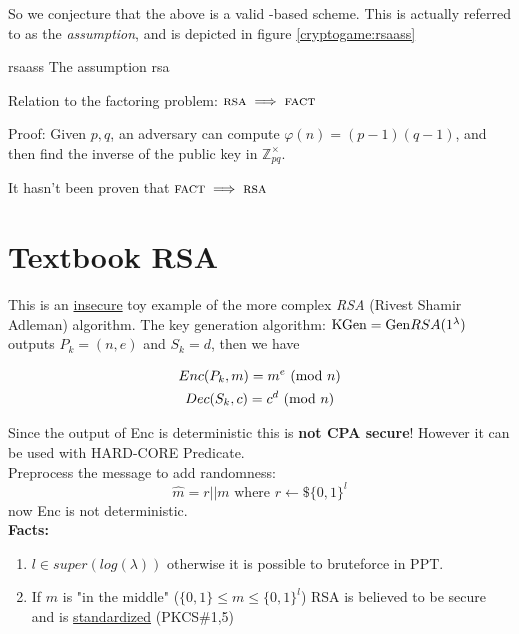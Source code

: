 So we conjecture that the above is a valid \tdp-based \pke scheme. This is actually referred to as the \emph{\rsa{} assumption}, and is depicted in figure \ref{cryptogame:rsaass}

\begin{cryptogame}
    {rsaass}
    {The \rsa{} assumption}
    {rsa}


    \cseqdelay


\end{cryptogame}


Relation to the factoring problem: $\textsc{rsa} \implies \textsc{fact}$

Proof: Given $p, q$, an adversary can compute $\varphi(n) = (p-1)(q-1)$, and then find the inverse of the public key in $\mathbb{Z}_{pq}^\times$.

It hasn't been proven that $\textsc{fact} \implies \textsc{rsa}$


\section{Textbook RSA}
This is an \underline{insecure} toy example of the more complex \textit{RSA} (Rivest Shamir Adleman) algorithm.
The key generation algorithm: $\mathrm{KGen}=\mathrm{Gen} RSA(1^{\lambda})$ outputs $P_k=(n,e)$ and $S_k=d$, then we have

\begin{gather*}
    Enc(P_k,m)=m^e\ (\mathrm{mod}\ n)\\
    Dec(S_k,c)=c^d\ (\mathrm{mod}\ n)
\end{gather*}

Since the output of Enc is deterministic this is \textbf{not CPA secure}! However it can be used with HARD-CORE Predicate.\\
Preprocess the message to add randomness:
$$\hat{m}=r||m \text{ where }r\leftarrow\mathdollar\{0,1\}^l$$
now Enc is not deterministic.\\
\textbf{Facts:}
\begin{enumerate}
    \item $l \in super(log(\lambda))$ otherwise it is possible to bruteforce in PPT.
    \item If $m$ is "in the middle" ($\{0,1\} \leq m \leq \{0,1\}^l$) RSA is believed to be secure and is \underline{standardized} (PKCS\#1,5)
\end{enumerate}



